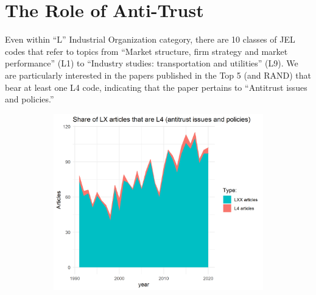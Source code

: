 \documentclass[11pt, letterpaper, twoside]{article}
\begin{document}
\begin{figure}
\begin{subfigure}[h]{0.49\textwidth}
    \end{subfigure}
\end{figure}

\newpage

\section{The Role of Anti-Trust}
Even within ``L'' Industrial Organization category, there are 10 classes of JEL codes that refer to topics from ``Market structure, firm strategy and market performance'' (L1) to ``Industry studies: transportation and utilities'' (L9). We are particularly interested in the papers published in the Top 5 (and RAND) that bear at least one L4 code, indicating that the paper pertains to ``Antitrust issues and policies.''

\begin{figure}
    \begin{subfigure}[h]{0.49\textwidth}
        \centering
        \includegraphics[width=\textwidth]{L4-vs-LXX.png}
    \end{subfigure}
    \hfill
    \begin{subfigure}[h]{0.49\textwidth}
        \centering

\end{subfigure}
\end{figure}
\end{document}
